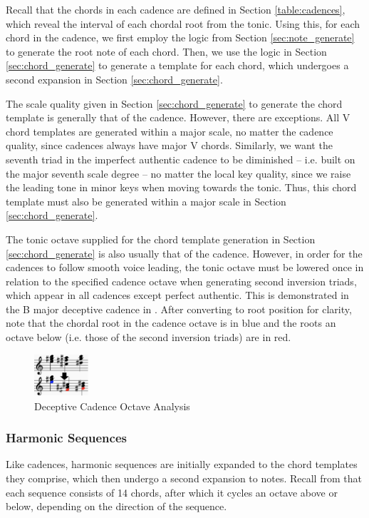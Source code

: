 \documentclass{article}
\begin{document}
Recall that the chords in each cadence are defined in Section \ref{table:cadences}, which reveal the interval of each chordal root from the tonic. Using this, for each chord in the cadence, we first employ the logic from Section \ref{sec:note_generate} to generate the root note of each chord. Then, we use the logic in Section \ref{sec:chord_generate} to generate a template for each chord, which undergoes a second expansion in Section \ref{sec:chord_generate}.

The scale quality given in Section \ref{sec:chord_generate} to generate the chord template is generally that of the cadence. However, there are exceptions. All V chord templates are generated within a major scale, no matter the cadence quality, since cadences always have major V chords. Similarly, we want the seventh triad in the imperfect authentic cadence to be diminished – i.e. built on the major seventh scale degree – no matter the local key quality, since we raise the leading tone in minor keys when moving towards the tonic. Thus, this chord template must also be generated within a major scale in Section \ref{sec:chord_generate}.

The tonic octave supplied for the chord template generation in Section \ref{sec:chord_generate} is also usually that of the cadence. However, in order for the cadences to follow smooth voice leading, the tonic octave must be lowered once in relation to the specified cadence octave when generating second inversion triads, which appear in all cadences except perfect authentic. This is demonstrated in the B major deceptive cadence in . After converting to root position for clarity, note that the chordal root in the cadence octave is in blue and the roots an octave below (i.e. those of the second inversion triads) are in red.

\begin{figure}[h!]
\centering
\includegraphics[width=0.18\textwidth]{images/cadence_octaves}
  \caption{Deceptive Cadence Octave Analysis}\label{fig:cadence_octaves}
\end{figure}

\subsubsection{Harmonic Sequences}
Like cadences, harmonic sequences are initially expanded to the chord templates they comprise, which then undergo a second expansion to notes. Recall from  that each sequence consists of 14 chords, after which it cycles an octave above or below, depending on the direction of the sequence.
\end{document}
